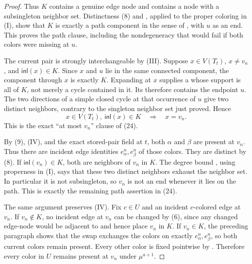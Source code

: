 \begin{proof}
Thus \(K\) contains a genuine edge node and contains a node with a
subsingleton neighbor set.  Distinctness (8) and
, applied to the proper coloring
in (I), show that \(K\) is exactly a path component in the sense of
, with \(u\) as an end.  This proves the
path clause, including the nondegeneracy that would fail if both colors
were missing at \(u\).

The current pair is strongly interchangeable by (III).  Suppose
\(x\in V(T_t)\), \(x\ne v_n\), and \(\mathsf{inl}(x)\in K\).  Since
\(x\) and \(u\) lie in the same connected component, the component
through \(x\) is exactly \(K\).  Expanding
 at \(x\) supplies a
 whose support is all of \(K\), not
merely a cycle contained in it.  Its  therefore
contains the endpoint \(u\).  The two directions of a simple closed
cycle at that occurrence of \(u\) give two distinct neighbors, contrary
to the singleton neighbor set just proved.  Hence
\[
 x\in V(T_t),\ \mathsf{inl}(x)\in K\quad\Longrightarrow\quad x=v_n.
                                                                    \tag{12}
\]
This is the exact ``at most \(v_n\)'' clause of (24).

By (9), (IV), and the exact stored-pair field at \(t\), both
\(\alpha\) and \(\beta\) are present at \(v_n\).  Thus there are
incident edge identities \(e_\alpha^n,e_\beta^n\) of those colors.
They are distinct by (8).  If \(\mathsf{inl}(v_n)\in K\), both are
neighbors of \(v_n\) in \(K\).  The degree bound
, using properness in (I), says
that these two distinct neighbors exhaust the neighbor set.  In
particular it is not subsingleton, so \(v_n\) is not an end whenever it
lies on the path.  This is exactly the remaining path assertion in (24).

The same argument preserves (IV).  Fix \(c\in U\) and an incident
\(c\)-colored edge at \(v_n\).  If \(v_n\notin K\), no incident edge
at \(v_n\) can be changed by (6), since any changed edge-node would be
adjacent to and hence place \(v_n\) in \(K\).  If \(v_n\in K\), the
preceding paragraph shows that the swap exchanges the colors on exactly
\(e_\alpha^n,e_\beta^n\), so both current colors remain present.  Every
other color is fixed pointwise by
.  Therefore every color in \(U\)
remains present at \(v_n\) under \(\mu^{a+1}\).


\end{proof}
